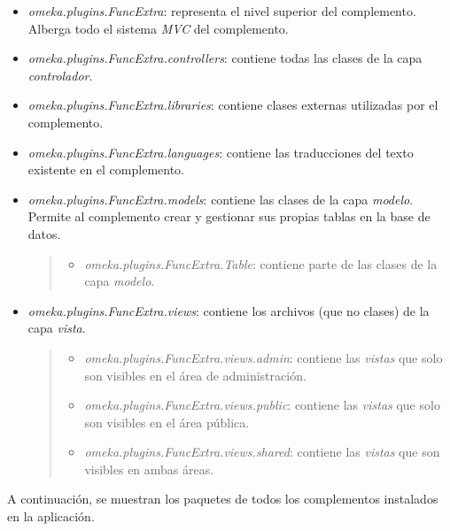 \begin{itemize}
\tightlist
\item
  \emph{omeka.plugins.FuncExtra}: representa el nivel superior del
  complemento. Alberga todo el sistema \emph{MVC} del complemento.
\item
  \emph{omeka.plugins.FuncExtra.controllers}: contiene todas las clases
  de la capa \emph{controlador}.
\item
  \emph{omeka.plugins.FuncExtra.libraries}: contiene clases externas
  utilizadas por el complemento.
\item
  \emph{omeka.plugins.FuncExtra.languages}: contiene las traducciones
  del texto existente en el complemento.
\item
  \emph{omeka.plugins.FuncExtra.models}: contiene las clases de la capa
  \emph{modelo}. Permite al complemento crear y gestionar sus propias
  tablas en la base de datos.

  \begin{quote}
  \begin{itemize}
  \tightlist
  \item
    \emph{omeka.plugins.FuncExtra.Table}: contiene parte de las clases
    de la capa \emph{modelo}.
  \end{itemize}
  \end{quote}
\item
  \emph{omeka.plugins.FuncExtra.views}: contiene los archivos (que no
  clases) de la capa \emph{vista}.

  \begin{quote}
  \begin{itemize}
  \tightlist
  \item
    \emph{omeka.plugins.FuncExtra.views.admin}: contiene las
    \emph{vistas} que solo son visibles en el área de administración.
  \item
    \emph{omeka.plugins.FuncExtra.views.public}: contiene las
    \emph{vistas} que solo son visibles en el área pública.
  \item
    \emph{omeka.plugins.FuncExtra.views.shared}: contiene las
    \emph{vistas} que son visibles en ambas áreas.
  \end{itemize}
  \end{quote}
\end{itemize}

A continuación, se muestran los paquetes de todos los complementos
instalados en la aplicación.


